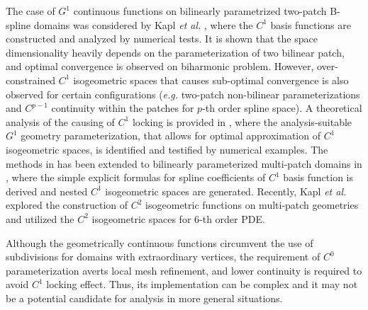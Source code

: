 \documentclass[preprint,12pt]{elsarticle}
\begin{document}
The case of $G^1$ continuous functions on bilinearly parametrized two-patch B-spline domains was considered by Kapl \textit{et al.} \cite{kapl_isogeometric_2015}, where the $C^1$ basis functions are constructed and analyzed by numerical tests. It is shown that the space dimensionality heavily depends on the parameterization of two bilinear patch, and optimal convergence is observed on biharmonic problem. However, over-constrained $C^1$ isogeometric spaces that causes sub-optimal convergence is also observed for certain configurations (\textit{e.g.} two-patch non-bilinear parameterizations and $C^{p-1}$ continuity within the patches for $p$-th order spline space). A theoretical analysis of the causing of $C^1$ locking is provided in \cite{collin_analysis-suitable_2016}, where the analysis-suitable $G^1$ geometry parameterization, that allows for optimal approximation of $C^1$ isogeometric spaces, is identified and testified by numerical examples. The methods in \cite{kapl_isogeometric_2015} has been extended to bilinearly parameterized multi-patch domains in \cite{kapl_isogeometric_2017}, where the simple explicit formulas for spline coefficients of $C^1$ basis function is derived and nested $C^1$ isogeometric spaces are generated. Recently, Kapl \textit{et al.} \cite{kapl_space_2017,kapl_space_nodate} explored the construction of $C^2$ isogeometric functions on multi-patch geometries and utilized the $C^2$ isogeometric spaces for $6$-th order PDE.\par
Although the geometrically continuous functions circumvent the use of subdivisions for domains with extraordinary vertices, the requirement of $C^0$ parameterization averts local mesh refinement, and lower continuity is required to avoid $C^1$ locking effect. Thus, its implementation can be complex and it may not be a potential candidate for analysis in more general situations.\par
\end{document}

